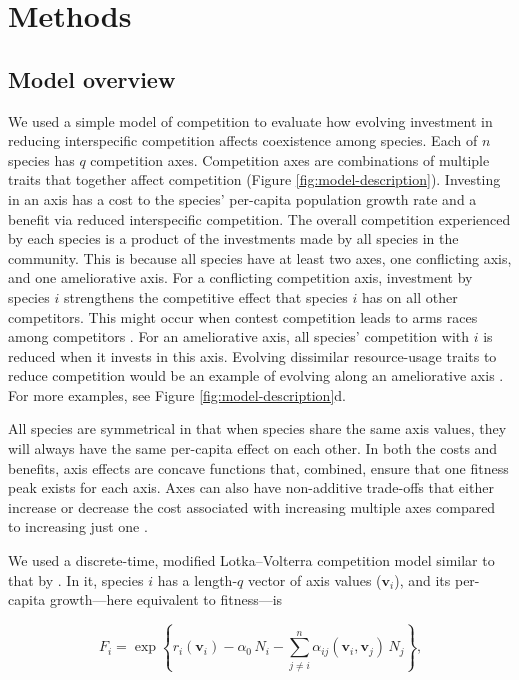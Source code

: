
\section*{Methods}


\subsection*{Model overview}

We used a simple model of competition to evaluate how evolving investment in 
reducing interspecific competition affects coexistence among species.
Each of $n$ species has $q$ competition axes.
Competition axes are combinations of multiple traits that together affect 
competition (Figure \ref{fig:model-description}).
Investing in an axis has a cost to the species' per-capita 
population growth rate and a benefit via reduced interspecific competition.
The overall competition experienced by each species is a product of 
the investments made by all species in the community.
This is because all species have at least two axes, 
one conflicting axis, and one ameliorative axis.
For a conflicting competition axis, investment by species $i$
strengthens the competitive effect that species $i$ has on all
other competitors.
This might occur when contest competition leads to arms races among competitors
\citep{Abrams1994}.
For an ameliorative axis, all species' competition with 
$i$ is reduced when it invests in this axis.
Evolving dissimilar resource-usage traits to reduce competition
would be an example of evolving along an ameliorative axis
\citep{Roughgarden1976}.
For more examples, see Figure \ref{fig:model-description}d.


All species are symmetrical in that when species share the same axis 
values, they will always have the same per-capita effect on each other.
In both the costs and benefits, axis effects are concave functions that,
combined, ensure that one fitness peak exists for each axis.
Axes can also have non-additive trade-offs that either increase or decrease
the cost associated with increasing multiple axes compared to increasing
just one \citep{Northfield2021}.


We used a discrete-time, modified Lotka--Volterra competition model similar to
that by \citet{Northfield2013a}.
In it, species $i$ has a length-$q$ vector of axis values ($\mathbf{v}_i$), and
its per-capita growth---here equivalent to fitness---is

\begin{equation} \label{eq:fitness}
    F_{i} = \exp \left\{ r_i(\mathbf{v}_i) - 
        \alpha_{0} \, N_i - \sum_{j \ne i}^{n}{
            \alpha_{ij}(\mathbf{v}_i, \mathbf{v}_j) \, N_j}  
    \right\}\textrm{,}
\end{equation}

